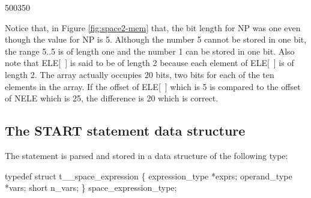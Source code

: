 \begin{fast_picture}{500}{350}
          \nextCbox{}
          \nextCbox{}
          \nextCbox{}
          \nextCbox{}
          \nextCbox{}
      \nextBbox{}
          \nextCbox{}
               \stackDbox
               \nextDbox{}
               \nextDbox{}
               \nextDbox{}
               \nextDbox{}
          \nextCbox{}
          \nextCbox{}
          \nextCbox{}
          \nextCbox{}
          \nextCbox{}
\nextFbox{}
      \nextBbox{}
      \nextBbox{}
      \nextBbox{}
      \nextBbox{}
      \nextBbox{}
\nextFbox{}
\end{fast_picture}

Notice that, in Figure \ref{fig:space2-mem} that,
the bit length for NP was one even
though the value for NP is 5.   Although the number 5 cannot be
stored in one bit, the range 5..5 is of length one and the number 1 can be
stored in one bit.
Also note that ELE[~] is said to be of length 2 because each element of ELE[~]
is of length 2.  The array actually occupies 20 bits, two bits for each of the
ten elements in the array.   If the offset of ELE[~] which is 5 is compared to
the offset of NELE which is 25, the difference is 20 which is correct.


\subsection{The START statement data structure}
\label{sec:start}

The  statement is parsed
and stored in a data structure of the following type:
\begin{codeexample}
typedef struct t__space_expression
   \{
       expression_type *exprs;
       operand_type *vars;
       short n_vars;
   \} space_expression_type;
\end{codeexample}


